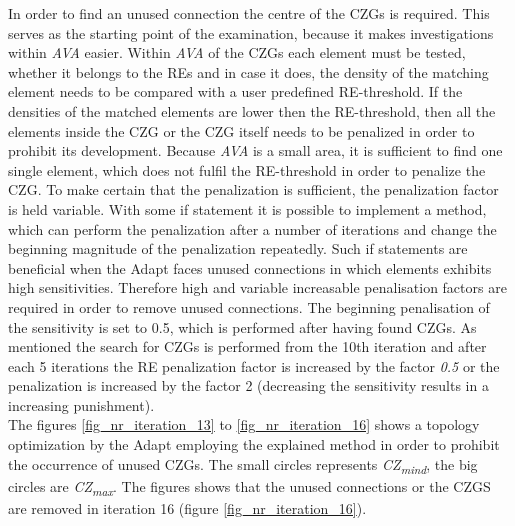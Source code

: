   In order to find an unused connection the centre of the
  CZGs is required. This serves as the starting point of the examination,
  because it makes investigations within \textit{AVA} easier.
  Within \textit{AVA} of the CZGs each element must
  be tested, whether it belongs to the REs and in case it does, 
 the density of the matching element needs to be compared
 with a user predefined RE-threshold. If the densities of the matched 
 elements are lower then the RE-threshold, then all the elements inside
 the CZG or the CZG itself needs to be penalized in order
 to prohibit its development. Because \textit{AVA} is a small area, it is 
 sufficient to find one single element, which does not fulfil
 the RE-threshold in order to penalize the CZG.
To make certain that the penalization is 
sufficient, the penalization factor is held variable. With some
if statement it is possible to implement a method, which
can perform the penalization after a number of iterations and
change the beginning magnitude of the penalization repeatedly.
Such if statements are beneficial when the Adapt
faces
unused connections in which elements exhibits high sensitivities.
Therefore high and variable increasable penalisation factors
are required in order to remove unused connections.
The beginning penalisation
of the sensitivity is set to 0.5, which is
performed after having found CZGs. As mentioned the search for
CZGs is performed from the 10th iteration and after each 5 iterations
the RE penalization factor is increased by the factor \emph{0.5} or 
the penalization is increased by the factor 2
(decreasing the 
sensitivity results in a increasing punishment).\\

The figures \ref{fig_nr_iteration_13} to \ref{fig_nr_iteration_16} shows
a topology optimization by the Adapt employing the explained 
method in order to prohibit the occurrence of unused CZGs. 
The small circles represents \textit{CZ\textsubscript{mind}}, the
big circles are \textit{CZ\textsubscript{max}}.
The figures shows that the unused connections 
or the CZGS are removed
in iteration 16 (figure \ref{fig_nr_iteration_16}).
 
